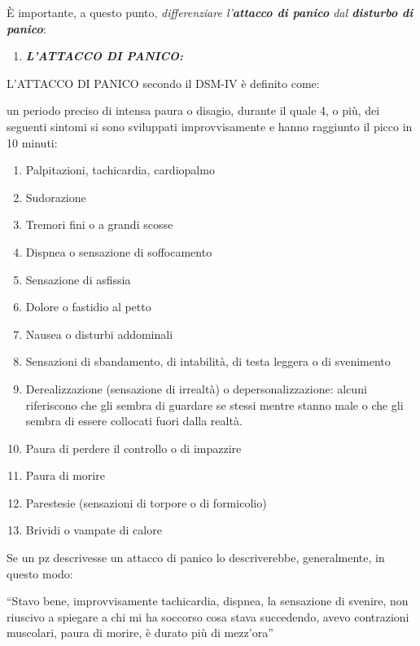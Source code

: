 \documentclass[]{article}
\begin{document}
È importante, a questo punto, \emph{differenziare l'\textbf{attacco di
panico} dal \textbf{disturbo di panico}}:

\begin{enumerate}
\def\labelenumi{\arabic{enumi}.}
\item
  \textbf{\emph{L'ATTACCO DI PANICO:}}
\end{enumerate}

L'ATTACCO DI PANICO secondo il DSM-IV è definito come:

un periodo preciso di intensa paura o disagio, durante il quale 4, o
più, dei seguenti sintomi si sono sviluppati improvvisamente e hanno
raggiunto il picco in 10 minuti:

\begin{enumerate}
\def\labelenumi{\arabic{enumi}.}
\item
  Palpitazioni, tachicardia, cardiopalmo
\item
  Sudorazione
\item
  Tremori fini o a grandi scosse
\item
  Dispnea o sensazione di soffocamento
\item
  Sensazione di asfissia
\item
  Dolore o fastidio al petto
\item
  Nausea o disturbi addominali
\item
  Sensazioni di sbandamento, di intabilità, di testa leggera o di
  svenimento
\item
  Derealizzazione (sensazione di irrealtà) o depersonalizzazione: alcuni
  riferiscono che gli sembra di guardare se stessi mentre stanno male o
  che gli sembra di essere collocati fuori dalla realtà.
\item
  Paura di perdere il controllo o di impazzire
\item
  Paura di morire
\item
  Parestesie (sensazioni di torpore o di formicolio)
\item
  Brividi o vampate di calore
\end{enumerate}

Se un pz descrivesse un attacco di panico lo descriverebbe,
generalmente, in questo modo:

``Stavo bene, improvvisamente tachicardia, dispnea, la sensazione di
svenire, non riuscivo a spiegare a chi mi ha soccorso cosa stava
succedendo, avevo contrazioni muscolari, paura di morire, è durato più
di mezz'ora''
\end{document}
